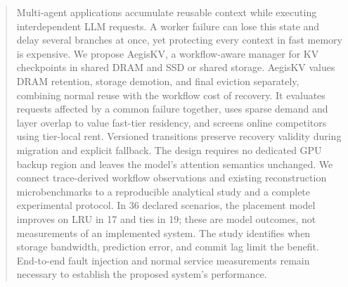 \begin{abstract}
Multi-agent applications accumulate reusable context while executing
interdependent LLM requests. A worker failure can lose this state and delay
several branches at once, yet protecting every context in fast memory is
expensive. We propose AegisKV, a workflow-aware manager for KV checkpoints
in shared DRAM and SSD or shared storage. AegisKV values DRAM retention,
storage demotion, and final eviction separately, combining normal reuse
with the workflow cost of recovery. It evaluates requests affected by a
common failure together, uses sparse demand and layer overlap to value
fast-tier residency, and screens online competitors using tier-local rent.
Versioned transitions preserve recovery validity during migration and
explicit fallback. The design requires no dedicated GPU backup region and leaves
the model's attention semantics unchanged. We connect trace-derived
workflow observations and existing reconstruction microbenchmarks to a
reproducible analytical study and a complete experimental protocol.
In 36 declared scenarios, the placement model improves on LRU in 17 and
ties in 19; these are model outcomes, not measurements of an implemented
system. The study identifies when storage bandwidth, prediction error,
and commit lag limit the benefit. End-to-end fault injection and normal
service measurements remain necessary to establish the proposed system's
performance.
\end{abstract}
